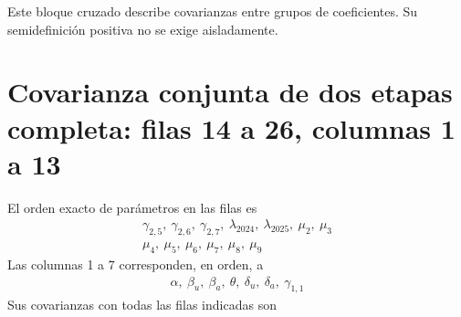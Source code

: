 \documentclass[11pt,a4paper]{article}
\begin{document}
Este bloque cruzado describe covarianzas entre grupos de coeficientes. Su semidefinición positiva no se exige aisladamente.

\clearpage
\section{Covarianza conjunta de dos etapas completa: filas 14 a 26, columnas 1 a 13}
El orden exacto de parámetros en las filas es
\[
\begin{gathered}\gamma_{2,5},\ \gamma_{2,6},\ \gamma_{2,7},\ \lambda_{2024},\ \lambda_{2025},\ \mu_2,\ \mu_3\\\mu_4,\ \mu_5,\ \mu_6,\ \mu_7,\ \mu_8,\ \mu_9\end{gathered}
\]
Las columnas 1 a 7 corresponden, en orden, a
\[
\begin{gathered}\alpha,\ \beta_u,\ \beta_a,\ \theta,\ \delta_u,\ \delta_a,\ \gamma_{1,1}\end{gathered}
\]
Sus covarianzas con todas las filas indicadas son
\end{document}
